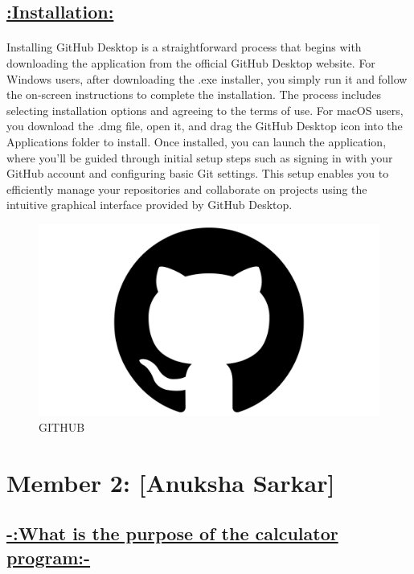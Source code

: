 \documentclass[a4paper,12pt]{article}
\begin{document}
\begin{center}
\section*{\uline{:Installation:}}
\end{center}

\paragraph{}
Installing GitHub Desktop is a straightforward process that begins with downloading the application from the official GitHub Desktop website. For Windows users, after downloading the .exe installer, you simply run it and follow the on-screen instructions to complete the installation. The process includes selecting installation options and agreeing to the terms of use. For macOS users, you download the .dmg file, open it, and drag the GitHub Desktop icon into the Applications folder to install. Once installed, you can launch the application, where you'll be guided through initial setup steps such as signing in with your GitHub account and configuring basic Git settings. This setup enables you to efficiently manage your repositories and collaborate on projects using the intuitive graphical interface provided by GitHub Desktop.

\begin{figure}[h!]
    \centering
    \includegraphics[width=0.5\linewidth]{GitHub-Symbol.png}
    \caption{GITHUB}
    
\end{figure}


\newpage

\section*{Member 2: [Anuksha Sarkar]}
\date{\today}
\FloatBarrier 
\begin{center}
\section*{\uline{-:What is the purpose of the calculator program:-}}
\end{center}
\end{document}
